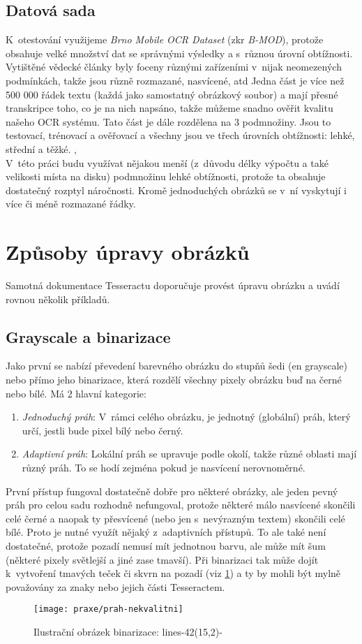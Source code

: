 \documentclass[12pt]{report}			%
\begin{document}
	\subsection{Datová sada}
	\label{sec:DataSet}
	K~otestování  využijeme \emph{Brno Mobile OCR Dataset} (\gls{zkr} \emph{\gls{B-MOD}}), protože obsahuje velké množství dat se správnými výsledky a s~různou úrovní obtížnosti. Vytištěné vědecké články byly foceny různými zařízeními v~nijak neomezených podmínkách, takže jsou různě rozmazané, nasvícené, \gls{atd} Jedna část je více než 500 000 řádek textu (každá jako samostatný obrázkový soubor) a mají přesné transkripce toho, co je na nich napsáno, takže můžeme snadno ověřit kvalitu našeho \gls{OCR} systému.  Tato část je dále rozdělena na 3 podmnožiny. Jsou to testovací, trénovací a ověřovací a všechny jsou ve třech úrovních obtížnosti: lehké, střední  a těžké. \parencite{pero_dataset}, \parencite{BMOD_article}\\
	V~této práci budu využívat nějakou menší (z~důvodu délky výpočtu a také velikosti místa na disku) podmnožinu lehké obtížnosti, protože ta obsahuje dostatečný rozptyl náročnosti. Kromě jednoduchých obrázků se v~ní vyskytují i více či méně rozmazané řádky.
	\section{Způsoby úpravy obrázků}
	Samotná dokumentace Tesseractu doporučuje provést úpravu obrázku a uvádí rovnou několik příkladů.  \parencite{Tess_wiki_improve}
	\subsection{Grayscale a binarizace}
	 Jako první se nabízí převedení barevného obrázku do stupňů šedi (\gls{en} grayscale) nebo přímo jeho binarizace, která rozdělí všechny pixely obrázku buď na černé nebo bílé. Má 2 hlavní kategorie:
	 \begin{enumerate}
	 \item{\emph{Jednoduchý práh}: V~rámci celého obrázku, je jednotný (globální) práh, který určí, jestli bude pixel bílý nebo černý.}
	 \item{\emph{Adaptivní práh}:  Lokální práh se upravuje podle okolí, takže různé oblasti mají různý práh. To se hodí zejména pokud je nasvícení nerovnoměrné.}
	  \end{enumerate}
	 První přístup fungoval dostatečně dobře pro některé obrázky, ale jeden pevný práh pro celou sadu rozhodně nefungoval, protože některé málo nasvícené skončili celé černé a naopak ty přesvícené (nebo jen s~nevýrazným textem) skončili celé bílé. Proto je nutné využít nějaký z~adaptivních přístupů. To ale také není dostatečné, protože pozadí nemusí mít jednotnou barvu, ale může mít šum (některé pixely světlejší a jiné zase tmavší). Při binarizaci tak může dojít k~vytvoření tmavých teček či skvrn na pozadí (\gls{viz} \ref{fig:binarizace}) a ty by mohli být mylně považovány za znaky nebo jejich části Tesseractem.
	\begin{figure}
	 \texttt{[image: praxe/prah-nekvalitni]}
	\centering
	\caption{Ilustrační obrázek binarizace: lines-42(15,2)-}
	\label{fig:binarizace}
	\end{figure}
\end{document}
